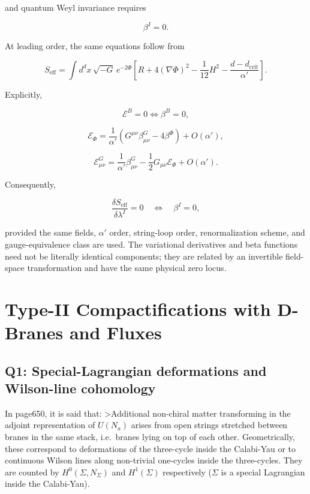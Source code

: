 \documentclass[
  10pt,
  a4paper,
  openany]{book}
\begin{document}
and quantum Weyl invariance requires

\[
\boxed{\beta^I=0.}
\]

At leading order, the same equations follow from

\[
\boxed{
S_{\mathrm{eff}}
=\int d^dx\,\sqrt{-G}\,e^{-2\Phi}
\left[
R+4(\nabla\Phi)^2-\frac1{12}H^2-\frac{d-d_{\mathrm{crit}}}{\alpha'}
\right].
}
\]

Explicitly,

\[
\mathcal E^B=0\Longleftrightarrow\beta^B=0,
\]

\[
\mathcal E_\Phi
=\frac1{\alpha'}\left(G^{\mu\nu}\beta^G_{\mu\nu}-4\beta^\Phi\right)
+O(\alpha'),
\]

\[
\mathcal E^G_{\mu\nu}
=\frac1{\alpha'}\beta^G_{\mu\nu}
-\frac12G_{\mu\nu}\mathcal E_\Phi
+O(\alpha').
\]

Consequently,

\[
\boxed{
\frac{\delta S_{\mathrm{eff}}}{\delta\lambda^I}=0
\quad\Longleftrightarrow\quad
\beta^I=0,
}
\]

provided the same fields, \(\alpha'\) order, string-loop order,
renormalization scheme, and gauge-equivalence class are used. The
variational derivatives and beta functions need not be literally
identical components; they are related by an invertible field-space
transformation and have the same physical zero locus.

\chapter{Type-II Compactifications with D-Branes and
Fluxes}\label{type-ii-compactifications-with-d-branes-and-fluxes-1}

\section{Q1: Special-Lagrangian deformations and Wilson-line
cohomology}\label{q1-special-lagrangian-deformations-and-wilson-line-cohomology}

In page650, it is said that: \textgreater Additional non-chiral matter
transforming in the adjoint representation of \(U(N_{a})\) arises from
open strings stretched between branes in the same stack, i.e.~branes
lying on top of each other. Geometrically, these correspond to
deformations of the three-cycle inside the Calabi-Yau or to continuous
Wilson lines along non-trivial one-cycles inside the three-cycles. They
are counted by \(H^0(\Sigma,N_{\Sigma})\) and \(H^1(\Sigma)\)
respectively (\(\Sigma\) is a special Lagrangian inside the Calabi-Yau).
\end{document}
